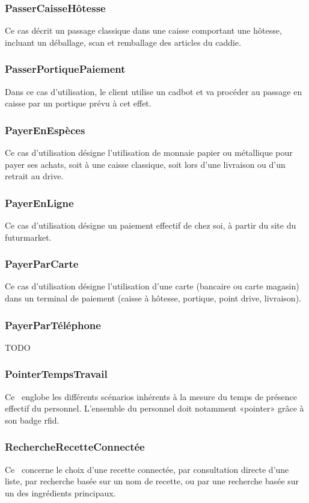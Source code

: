 \subsubsection{PasserCaisseHôtesse}
Ce cas décrit un passage classique dans une caisse comportant une hôtesse, incluant un déballage, scan et remballage des articles du caddie.

\subsubsection{PasserPortiquePaiement}
Dans ce cas d'utilisation, le client utilise un cadbot et va procéder au passage en caisse par un portique prévu à cet effet. 

\subsubsection{PayerEnEspèces}
Ce cas d'utilisation désigne l'utilisation de monnaie papier ou métallique pour payer ses achats, soit à une caisse classique, soit lors d'une livraison ou d'un retrait au drive.

\subsubsection{PayerEnLigne}
Ce cas d'utilisation désigne un paiement effectif de chez soi, à partir du site du futurmarket.

\subsubsection{PayerParCarte}
Ce cas d'utilisation désigne l'utilisation d'une carte (bancaire ou carte magasin) dans un terminal de paiement (caisse à hôtesse, portique, point drive, livraison).

\subsubsection{PayerParTéléphone}
TODO

\subsubsection{PointerTempsTravail}
Ce \cu\ englobe les différents scénarios inhérents à la mesure du temps de présence effectif du personnel.
L'ensemble du personnel doit notamment «pointer» grâce à son badge rfid.

\subsubsection{RechercheRecetteConnectée}
Ce \cu\ concerne le choix d'une recette connectée, par consultation directe d'une liste, par recherche basée sur un nom de recette, ou par une recherche basée sur un des ingrédients principaux.

